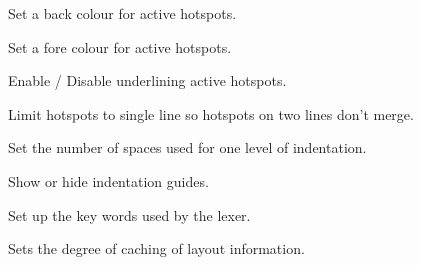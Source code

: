 Set a back colour for active hotspots.


\label{wxstyledtextctrlsethotspotactiveforeground}


Set a fore colour for active hotspots.


\label{wxstyledtextctrlsethotspotactiveunderline}


Enable / Disable underlining active hotspots.


\label{wxstyledtextctrlsethotspotsingleline}


Limit hotspots to single line so hotspots on two lines don't merge.


\label{wxstyledtextctrlsetindent}


Set the number of spaces used for one level of indentation.


\label{wxstyledtextctrlsetindentationguides}


Show or hide indentation guides.


\label{wxstyledtextctrlsetkeywords}


Set up the key words used by the lexer.


\label{wxstyledtextctrlsetlastkeydownprocessed}



\label{wxstyledtextctrlsetlayoutcache}


Sets the degree of caching of layout information.


